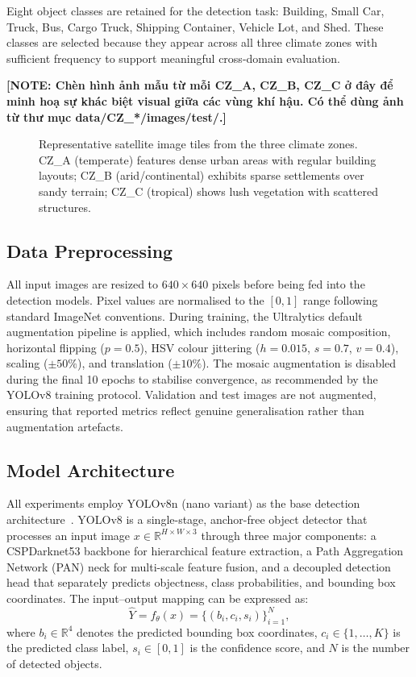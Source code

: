 \documentclass[12pt,a4paper]{article}
\newcommand{\note}[1]{{\color{warningred}\bfseries [NOTE: #1]}}
\begin{document}
Eight object classes are retained for the detection task: Building, Small Car, Truck, Bus, Cargo Truck, Shipping Container, Vehicle Lot, and Shed. These classes are selected because they appear across all three climate zones with sufficient frequency to support meaningful cross-domain evaluation.

\note{Chèn hình ảnh mẫu từ mỗi CZ\_A, CZ\_B, CZ\_C ở đây để minh hoạ sự khác biệt visual giữa các vùng khí hậu. Có thể dùng ảnh từ thư mục data/CZ\_*/images/test/.}

\begin{figure}[H]
\centering
\caption{Representative satellite image tiles from the three climate zones. CZ\_A (temperate) features dense urban areas with regular building layouts; CZ\_B (arid/continental) exhibits sparse settlements over sandy terrain; CZ\_C (tropical) shows lush vegetation with scattered structures.}
\label{fig:dataset_examples}
\end{figure}


\subsection{Data Preprocessing}

All input images are resized to $640\times640$ pixels before being fed into the detection models. Pixel values are normalised to the $[0, 1]$ range following standard ImageNet conventions. During training, the Ultralytics default augmentation pipeline is applied, which includes random mosaic composition, horizontal flipping ($p=0.5$), HSV colour jittering ($h=0.015$, $s=0.7$, $v=0.4$), scaling ($\pm50\%$), and translation ($\pm10\%$). The mosaic augmentation is disabled during the final 10 epochs to stabilise convergence, as recommended by the YOLOv8 training protocol. Validation and test images are not augmented, ensuring that reported metrics reflect genuine generalisation rather than augmentation artefacts.

\subsection{Model Architecture}

All experiments employ YOLOv8n (nano variant) as the base detection architecture~\cite{jocher2023yolov8}. YOLOv8 is a single-stage, anchor-free object detector that processes an input image $x \in \mathbb{R}^{H \times W \times 3}$ through three major components: a CSPDarknet53 backbone for hierarchical feature extraction, a Path Aggregation Network (PAN) neck for multi-scale feature fusion, and a decoupled detection head that separately predicts objectness, class probabilities, and bounding box coordinates. The input--output mapping can be expressed as:
\begin{equation}
    \hat{Y} = f_\theta(x) = \{(b_i, c_i, s_i)\}_{i=1}^{N},
\end{equation}
where $b_i \in \mathbb{R}^4$ denotes the predicted bounding box coordinates, $c_i \in \{1, \ldots, K\}$ is the predicted class label, $s_i \in [0, 1]$ is the confidence score, and $N$ is the number of detected objects.
\end{document}
